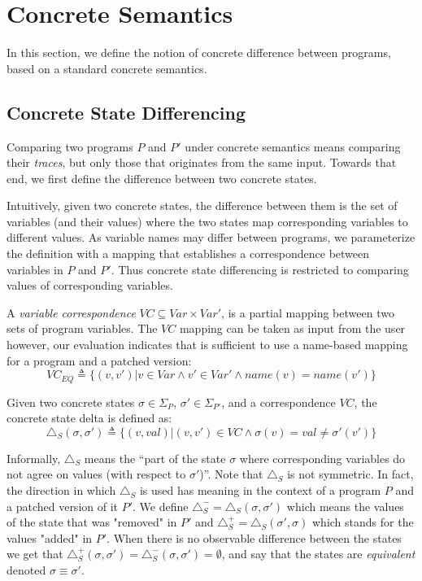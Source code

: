 \section{Concrete Semantics}
In this section, we define the notion of concrete difference between programs, based on a standard concrete semantics.

\subsection{Concrete State Differencing}
Comparing two programs $P$ and $P'$ under concrete semantics means comparing their \emph{traces}, but only those that originates from the same input. Towards that end, we first define the difference between two concrete states.

Intuitively, given two concrete states, the difference between them is the set of variables (and their values) where the two states map corresponding variables to different values. As variable names may differ between programs, we parameterize the definition with a mapping that establishes a correspondence between variables in $P$ and $P'$. Thus concrete state differencing is restricted to comparing values of corresponding variables.

\begin{definition} 
A \emph{variable correspondence} $VC \subseteq Var \times Var'$, is a partial mapping between two sets of program variables. The $VC$ mapping can be taken as input from the user however, our evaluation indicates that is sufficient to use a name-based mapping for a program and a patched version:
\[
VC_{EQ} \triangleq \{(v,v') | v \in Var \wedge v' \in Var' \wedge name(v) = name(v')\}
\]
\end{definition}

\begin{definition} 
Given two concrete states $\sigma \in \Sigma_{P}$, $\sigma' \in \Sigma_{P'}$, and a correspondence $VC$, the concrete state delta is defined as:
\[
\triangle_{S}(\sigma,\sigma') \triangleq \{ (v,val) | (v,v') \in VC \wedge \sigma(v) = val \neq \sigma'(v')\}
\]
\end{definition}
Informally, $\triangle_{S}$ means the ``part of the state $\sigma$ where corresponding variables do not agree on values (with respect to $\sigma'$)''. Note that $\triangle_{S}$ is not symmetric. In fact, the direction in which $\triangle_{S}$ is used has meaning in the context of a program $P$ and a patched version of it $P'$. We define $\triangle_{S}^{-} = \triangle_{S}(\sigma,\sigma')$ which means the values of the state that was "removed" in $P'$ and $\triangle_{S}^{+} = \triangle_{S}(\sigma',\sigma)$ which stands for the values "added" in $P'$. When there is no observable difference between the states we get that $\triangle_{S}^{+}(\sigma,\sigma')= \triangle_{S}^{-}(\sigma,\sigma') = \emptyset$, and say that the states are \emph{equivalent} denoted $\sigma \equiv \sigma'$.

